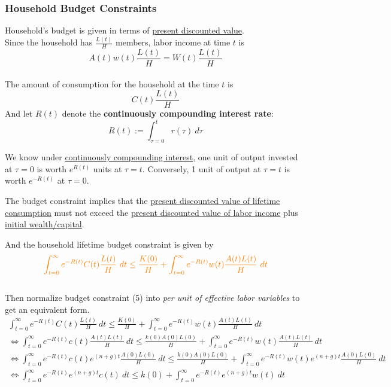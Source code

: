 \documentclass[11pt]{article}
\begin{document}
	\subsubsection{Household Budget Constraints}
	\par Household's budget is given in terms of \ul{present discounted value}. \\
	Since the household has $\frac{L(t)}{H}$ members, labor income at time $t$ is 
	\[
		A(t)w(t)\frac{L(t)}{H} = W(t)\frac{L(t)}{H}
	\]
	\\
	The amount of consumption for the household at the time $t$ is 
	\[
		C(t)\frac{L(t)}{H}
	\]
	And let $R(t)$ denote the \textbf{continuously compounding interest rate}:
	\begin{equation}
		R(t) := \int_{\tau=0}^t r(\tau)\ d\tau
	\end{equation}
	\begin{remark}
		We know under \ul{continuously compounding interest}, one unit of output invested at $\tau=0$ is worth $e^{R(t)}$ units at $\tau=t$. Conversely, 1 unit of output at $\tau=t$ is worth $e^{-R(t)}$ at $\tau=0$.
	\end{remark}
	\begin{remark}
		The budget constraint implies that the \ul{present discounted value of lifetime consumption} must not exceed the \ul{present discounted value of labor income} plus \ul{initial wealth/capital}.
	\end{remark}
	\par And the household lifetime budget constraint is given by
	\begin{equation}
		\textcolor{orange}{
			\int_{t=0}^\infty e^{-R(t)} C(t) \frac{L(t)}{H}\ dt \leq \frac{K(0)}{H} + \int_{t=0}^\infty e^{-R(t)} w(t) \frac{A(t)L(t)}{H}\ dt
		}
	\end{equation}
	\\
	Then normalize budget constraint (5) into \emph{per unit of effective labor variables} to get an equivalent form.
	\begin{gather*}
		\int_{t=0}^\infty e^{-R(t)} C(t) \frac{L(t)}{H}\ dt  \leq \frac{K(0)}{H} + \int_{t=0}^\infty e^{-R(t)} w(t) \frac{A(t)L(t)}{H}\ dt \\
		\iff 
		\int_{t=0}^\infty e^{-R(t)} c(t) \frac{A(t)L(t)}{H}\ dt \leq \frac{k(0)A(0)L(0)}{H} + \int_{t=0}^\infty e^{-R(t)} w(t) \frac{A(t)L(t)}{H}\ dt \\ 
		\iff \int_{t=0}^\infty e^{-R(t)} c(t) e^{(n+g)t} \frac{A(0)L(0)}{H}\ dt \leq \frac{k(0)A(0)L(0)}{H} + \int_{t=0}^\infty e^{-R(t)} w(t) e^{(n+g)t}\frac{A(0)L(0)}{H}\ dt \\
		\iff \int_{t=0}^\infty e^{-R(t)} e^{(n+g)t} c(t)\ dt \leq k(0) + \int_{t=0}^\infty e^{-R(t)} e^{(n+g)t} w(t)\ dt
	\end{gather*}
\end{document}
